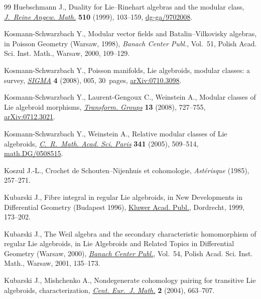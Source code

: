 \documentclass[pdftex]{sigma}
\numberwithin{equation}{section}
\newcommand{\8}{\infty}
\begin{document}
\begin{thebibliography}{99}
Huebschmann J., Duality for {L}ie--{R}inehart algebras and the modular class,
 \href{https://doi.org/10.1515/crll.1999.043}{\textit{J.~Reine Angew. Math.}} \textbf{510} (1999), 103--159,
 \href{https://arxiv.org/abs/dg-ga/9702008}{dg-ga/9702008}.

Kosmann-Schwarzbach Y., Modular vector fields and {B}atalin--{V}ilkovisky
 algebras, in Poisson Geometry ({W}arsaw, 1998), \textit{Banach Center Publ.},
 Vol.~51, Polish Acad. Sci. Inst. Math., Warsaw, 2000, 109--129.

Kosmann-Schwarzbach Y., Poisson manifolds, {L}ie algebroids, modular classes: a
 survey, \href{https://doi.org/10.3842/SIGMA.2008.005}{\textit{SIGMA}} \textbf{4} (2008), 005, 30~pages, \href{https://arxiv.org/abs/0710.3098}{arXiv:0710.3098}.

Kosmann-Schwarzbach Y., Laurent-Gengoux C., Weinstein A., Modular classes of
 {L}ie algebroid morphisms, \href{https://doi.org/10.1007/s00031-008-9032-y}{\textit{Transform. Groups}} \textbf{13} (2008),
 727--755, \href{https://arxiv.org/abs/0712.3021}{arXiv:0712.3021}.

Kosmann-Schwarzbach Y., Weinstein A., Relative modular classes of {L}ie
 algebroids, \href{https://doi.org/10.1016/j.crma.2005.09.010}{\textit{C.~R.~Math. Acad. Sci. Paris}} \textbf{341} (2005),
 509--514, \href{https://arxiv.org/abs/math.DG/0508515}{math.DG/0508515}.

Koszul J.-L., Crochet de {S}chouten--{N}ijenhuis et cohomologie,
 \textit{Ast\'{e}risque} (1985), 257--271.

Kubarski J., Fibre integral in regular {L}ie algebroids, in New Developments in
 Differential Geometry ({B}udapest 1996), \href{https://doi.org/10.1007/978-94-011-5276-1_12}{Kluwer Acad. Publ.}, Dordrecht, 1999,
 173--202.

Kubarski J., The {W}eil algebra and the secondary characteristic homomorphism
 of regular {L}ie algebroids, in Lie Algebroids and Related Topics in
 Differential Geometry ({W}arsaw, 2000), \href{https://doi.org/10.4064/bc54-0-9}{\textit{Banach Center Publ.}},
 Vol.~54, Polish Acad. Sci. Inst. Math., Warsaw, 2001, 135--173.

Kubarski J., Mishchenko A., Nondegenerate cohomology pairing for transitive
 {L}ie algebroids, characterization, \href{https://doi.org/10.2478/BF02475971}{\textit{Cent. Eur.~J. Math.}} \textbf{2}
 (2004), 663--707.


\end{thebibliography}
\end{document}
